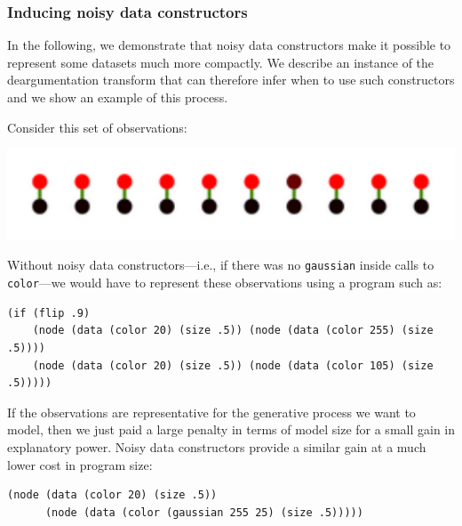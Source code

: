 \documentclass[a4paper,10pt]{article}
\begin{document}
\subsubsection{Inducing noisy data constructors}

In the following, we demonstrate that noisy data constructors make it possible to represent some datasets much more compactly. We describe an instance of the deargumentation transform that can therefore infer when to use such constructors and we show an example of this process.


Consider this set of observations:

\includegraphics[scale=.60]{../figures/noisyConstructor.pdf}

Without noisy data constructors---i.e., if there was no \texttt{gaussian} inside calls to \texttt{color}---we would have to represent these observations using a program such as:
\begin{lstlisting}
(if (flip .9)
    (node (data (color 20) (size .5)) (node (data (color 255) (size .5))))
    (node (data (color 20) (size .5)) (node (data (color 105) (size .5)))))
\end{lstlisting}
If the observations are representative for the generative process we want to model, then we just paid a large penalty in terms of model size for a small gain in explanatory power. Noisy data constructors provide a similar gain at a much lower cost in program size:
\begin{lstlisting}
(node (data (color 20) (size .5))
      (node (data (color (gaussian 255 25) (size .5)))))
\end{lstlisting}


\end{document}
